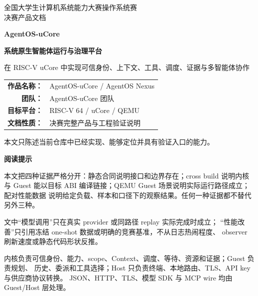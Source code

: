 \begin{titlepage}
  \thispagestyle{empty}
  \centering
  \vspace*{1.2cm}
  {\sffamily\Large\color{AgentBlue} 全国大学生计算机系统能力大赛操作系统赛\\[0.5em]
  决赛产品文档\par}

  \vspace{2.2cm}
  {\sffamily\bfseries\fontsize{34}{44}\selectfont\color{AgentInk}
  AgentOS-uCore\par}
  \vspace{0.45cm}
  {\sffamily\bfseries\fontsize{22}{30}\selectfont\color{AgentBlue}
  系统原生智能体运行与治理平台\par}

  \vspace{1.1cm}
  {\large 在 RISC-V uCore 中实现可信身份、上下文、工具、调度、证据与多智能体协作\par}

  \vfill
  \begin{tcolorbox}[
    width=0.82\textwidth,colback=AgentPaper,colframe=AgentLine,
    boxrule=0.6pt,arc=1mm,left=6mm,right=6mm,top=5mm,bottom=5mm]
    \centering
    \begin{tabular}{rl}
      \textbf{作品名称：} & AgentOS-uCore / AgentOS Nexus \\
      \textbf{团队：} & AgentOS-uCore 团队 \\
      \textbf{目标平台：} & RISC-V 64 / uCore / QEMU \\
      \textbf{文档性质：} & 决赛完整产品与工程验证说明
    \end{tabular}
  \end{tcolorbox}

  \vspace{1.4cm}
  {\small\color{AgentMuted}
  本文只陈述当前仓库中已经实现、能够定位并具有验证入口的能力。\par}
  \vspace{0.8cm}
\end{titlepage}

\clearpage
\thispagestyle{empty}
\vspace*{3cm}
\begin{center}
  {\Large\sffamily\bfseries\color{AgentInk} 阅读提示}
\end{center}
\vspace{1cm}

本文把四种证据严格分开：静态合同说明接口和边界存在；cross build 说明内核与
Guest 能以目标 ABI 编译链接；QEMU Guest 场景说明实际运行路径成立；配对性能数据
说明给定负载、样本和口径下的观察结果。任何一种证据都不替代另外三种。

文中“模型调用”只在真实 provider 或同路径 replay 实际完成时成立；
“性能改善”只引用冻结 one-shot 数据或明确的竞赛基准，不从日志热闹程度、
observer 刷新速度或静态代码形状反推。

\vfill
\begin{boundarybox}[诚实边界]
内核负责可信身份、能力、scope、Context、调度、等待、资源和证据；Guest 负责规划、
历史、委派和工具选择；Host 只负责终端、本地路由、TLS、API key 与供应商协议转换。
JSON、HTTP、TLS、模型 SDK 与 MCP wire 均由 Guest/Host 层处理。
\end{boundarybox}
\clearpage
